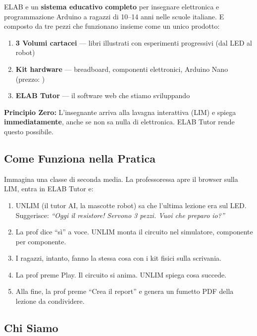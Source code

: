 \documentclass[11pt,a4paper]{article}
\begin{document}
ELAB e un \textbf{sistema educativo completo} per insegnare elettronica e programmazione Arduino a ragazzi di 10--14 anni nelle scuole italiane. E composto da tre pezzi che funzionano insieme come un unico prodotto:

\begin{enumerate}[leftmargin=2em]
  \item \textbf{3 Volumi cartacei} --- libri illustrati con esperimenti progressivi (dal LED al robot)
  \item \textbf{Kit hardware} --- breadboard, componenti elettronici, Arduino Nano (prezzo: )
  \item \textbf{ELAB Tutor} --- il software web che stiamo sviluppando
\end{enumerate}

\begin{principiobox}
\textbf{Principio Zero:} L'insegnante arriva alla lavagna interattiva (LIM) e spiega \textbf{immediatamente}, anche se non sa nulla di elettronica. ELAB Tutor rende questo possibile.
\end{principiobox}

\subsection{Come Funziona nella Pratica}

Immagina una classe di seconda media. La professoressa apre il browser sulla LIM, entra in ELAB Tutor e:

\begin{enumerate}[leftmargin=2em]
  \item UNLIM (il tutor AI, la mascotte robot) sa che l'ultima lezione era sul LED. Suggerisce: \textit{``Oggi il resistore! Servono 3 pezzi. Vuoi che preparo io?''}
  \item La prof dice ``s\`i'' a voce. UNLIM monta il circuito nel simulatore, componente per componente.
  \item I ragazzi, intanto, fanno la stessa cosa con i kit fisici sulla scrivania.
  \item La prof preme Play. Il circuito si anima. UNLIM spiega cosa succede.
  \item Alla fine, la prof preme ``Crea il report'' e genera un fumetto PDF della lezione da condividere.
\end{enumerate}

\subsection{Chi Siamo}
\end{document}
